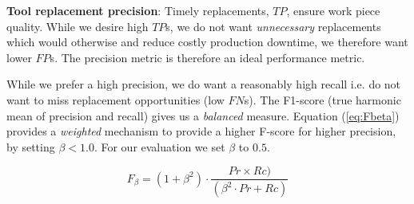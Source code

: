 \documentclass[a4paper, 12pt]{article}
\begin{document}
\textbf{Tool replacement precision}: Timely replacements, $TP$, ensure work piece quality. While we desire high $TP$s, we do not want \textit{unnecessary} replacements which would otherwise and reduce costly production downtime, we therefore want lower $FP$s. The precision metric is therefore an ideal performance metric. 

While we prefer a high precision, we do want a reasonably high recall i.e. do not want to miss replacement opportunities (low $FN$s). The F1-score (true harmonic mean of precision and recall) gives us a \textit{balanced} measure. Equation (\ref{eq:Fbeta}) provides a \textit{weighted} mechanism to provide a higher F-score for higher precision, by setting $\beta < 1.0$. For our evaluation we set $\beta$ to $0.5$.

\begin{equation}
	F_{\beta} = (1+\beta^2) \cdot \frac{Pr \times Rc)}{(\beta^2 \cdot Pr + Rc)}
	\label{eq:Fbeta}
\end{equation}

%	
\end{document}
